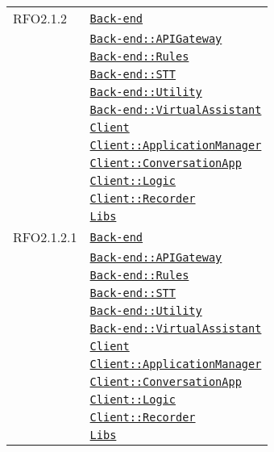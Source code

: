 \begin{longtable}{|>{\centering}m{3cm}|m{10cm}<{\centering}|}
RFO2.1.2 & \hyperref[Back-end]{\texttt{Back-end}}\\
& \hyperref[Back-end::APIGateway]{\texttt{Back-end::APIGateway}}\\
& \hyperref[Back-end::Rules]{\texttt{Back-end::Rules}}\\
& \hyperref[Back-end::STT]{\texttt{Back-end::STT}}\\
& \hyperref[Back-end::Utility]{\texttt{Back-end::Utility}}\\
& \hyperref[Back-end::VirtualAssistant]{\texttt{Back-end::VirtualAssistant}}\\
& \hyperref[Client]{\texttt{Client}}\\
& \hyperref[Client::ApplicationManager]{\texttt{Client::ApplicationManager}}\\
& \hyperref[Client::ConversationApp]{\texttt{Client::ConversationApp}}\\
& \hyperref[Client::Logic]{\texttt{Client::Logic}}\\
& \hyperref[Client::Recorder]{\texttt{Client::Recorder}}\\
& \hyperref[Libs]{\texttt{Libs}}\\ \hline

RFO2.1.2.1 & \hyperref[Back-end]{\texttt{Back-end}}\\
& \hyperref[Back-end::APIGateway]{\texttt{Back-end::APIGateway}}\\
& \hyperref[Back-end::Rules]{\texttt{Back-end::Rules}}\\
& \hyperref[Back-end::STT]{\texttt{Back-end::STT}}\\
& \hyperref[Back-end::Utility]{\texttt{Back-end::Utility}}\\
& \hyperref[Back-end::VirtualAssistant]{\texttt{Back-end::VirtualAssistant}}\\
& \hyperref[Client]{\texttt{Client}}\\
& \hyperref[Client::ApplicationManager]{\texttt{Client::ApplicationManager}}\\
& \hyperref[Client::ConversationApp]{\texttt{Client::ConversationApp}}\\
& \hyperref[Client::Logic]{\texttt{Client::Logic}}\\
& \hyperref[Client::Recorder]{\texttt{Client::Recorder}}\\
& \hyperref[Libs]{\texttt{Libs}}\\ \hline


\end{longtable}
